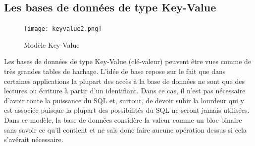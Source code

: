 \documentclass[11pt]{article}
\begin{document}
\subsection{Les bases de données de type Key-Value}
\begin{figure}[H]
  \centering
  \begin{center}
    \texttt{[image: keyvalue2.png]}
  \end{center}
  \caption{Modèle Key-Value\cite{tourhorizon}}
\end{figure}
Les bases de données de type Key-Value (clé-valeur) peuvent être vues comme de très grandes tables de hachage. L'idée de base repose sur le fait que dans certaines applications la plupart des accès à la base de données ne sont que des lectures ou écriture à partir d'un identifiant. Dans ce cas, il n'est pas nécessaire d'avoir toute la puissance du SQL et, surtout, de devoir subir la lourdeur qui y est associée puisque la plupart des possibilités du SQL ne seront jamais utilisées. Dans ce modèle, la base de données considère la valeur comme un bloc binaire sans savoir ce qu'il contient et ne sais donc faire aucune opération dessus si cela s'avérait nécessaire.
\end{document}

